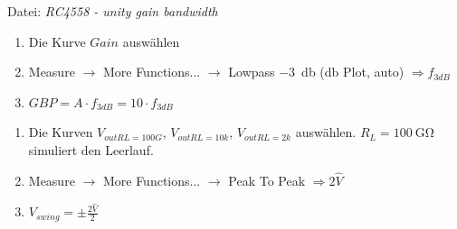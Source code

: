 \documentclass[
	ngerman,
	parskip=half,
	headsepline,
	twocolumn,
	DIV=calc,
	listof=leveldown,
	]{scrartcl}
\begin{document}
	
	Datei: \emph{RC4558 - unity gain bandwidth}
	\begin{enumerate}
		\item Die Kurve $Gain$ auswählen
		\item Measure $\rightarrow$ More Functions... $\rightarrow$ Lowpass \SI{-3}{\decibel} (db Plot, auto) $\Rightarrow f_{3dB}$
		\item $ GBP = A \cdot f_{3dB} = 10 \cdot f_{3dB} $
	\end{enumerate}
	
	\begin{enumerate}
		\item Die Kurven $V_{out RL=100G}$, $V_{out RL=10k}$, $V_{out RL=2k}$ auswählen. $R_L=\SI{100}{\giga\ohm}$ simuliert den Leerlauf.
		\item Measure $\rightarrow$ More Functions... $\rightarrow$ Peak To Peak $\Rightarrow 2\hat{V}$
		\item $V_{swing} = \pm \frac{2\hat{V}}{2}$
	\end{enumerate}

\listoffigures
\listoftables
\printbibliography
		
\end{document}
